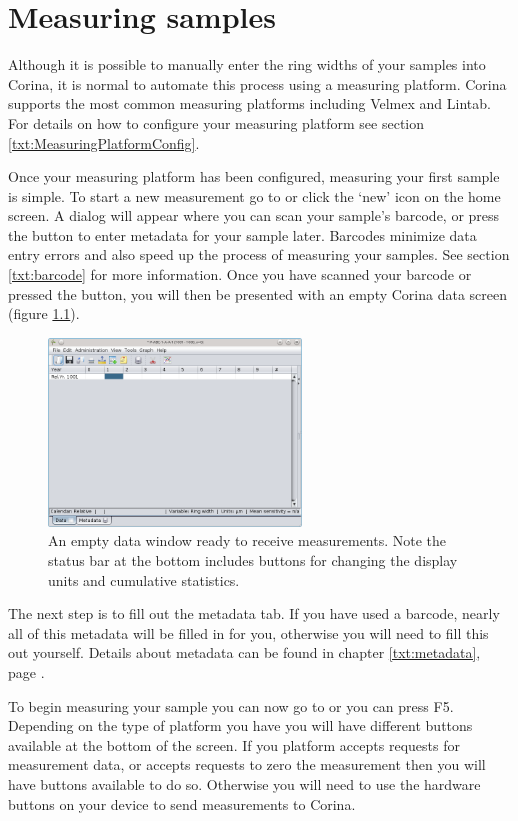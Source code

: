 \chapter{Measuring samples}
Although it is possible to manually enter the ring widths of your samples into Corina, it is normal to automate this process using a measuring platform. Corina supports the most common measuring platforms including Velmex and Lintab.  For details on how to configure your measuring platform see section \ref{txt:MeasuringPlatformConfig}.

Once your measuring platform has been configured, measuring your first sample is simple.  To start a new measurement go to  or click the `new' icon on the home screen. A dialog will appear where you can scan your sample's barcode, or press the button to enter metadata for your sample later. Barcodes minimize data entry errors and also speed up the process of measuring your samples. See section \ref{txt:barcode} for more information. Once you have scanned your barcode or pressed the button, you will then be presented with an empty Corina data screen (figure \ref{fig:datascreen}).

\begin{figure}[hbtp]
  \centering
    \includegraphics[width=0.6\textwidth]{Images/datascreen.png}
    \caption{An empty data window ready to receive measurements.  Note the status bar at the bottom includes buttons for changing the display units and cumulative statistics.}
    \label{fig:datascreen}
\end{figure}

The next step is to fill out the metadata tab. If you have used a barcode, nearly all of this metadata will be filled in for you, otherwise you will need to fill this out yourself. Details about metadata can be found in chapter \ref{txt:metadata}, page \pageref{txt:metadata}.

To begin measuring your sample you can now go to  or you can press F5. Depending on the type of platform you have you will have different buttons available at the bottom of the screen.  If you platform accepts requests for measurement data, or accepts requests to zero the measurement then you will have buttons available to do so.  Otherwise you will need to use the hardware buttons on your device to send measurements to Corina.

